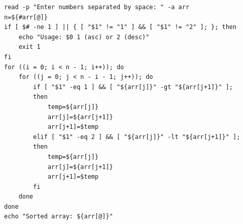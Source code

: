 \begin{verbatim}
read -p "Enter numbers separated by space: " -a arr
n=${#arr[@]}
if [ $# -ne 1 ] || { [ "$1" != "1" ] && [ "$1" != "2" ]; }; then
    echo "Usage: $0 1 (asc) or 2 (desc)"
    exit 1
fi
for ((i = 0; i < n - 1; i++)); do
    for ((j = 0; j < n - i - 1; j++)); do
        if [ "$1" -eq 1 ] && [ "${arr[j]}" -gt "${arr[j+1]}" ]; 
        then
            temp=${arr[j]}
            arr[j]=${arr[j+1]}
            arr[j+1]=$temp
        elif [ "$1" -eq 2 ] && [ "${arr[j]}" -lt "${arr[j+1]}" ];
        then
            temp=${arr[j]}
            arr[j]=${arr[j+1]}
            arr[j+1]=$temp
        fi
    done
done
echo "Sorted array: ${arr[@]}"
\end{verbatim}